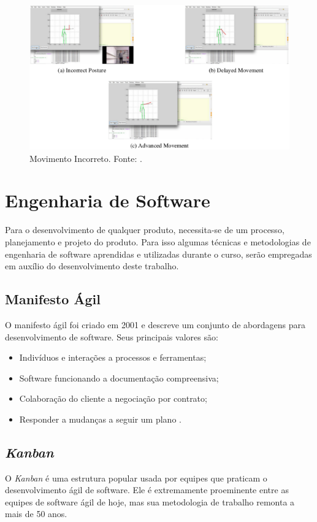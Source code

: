 \begin{figure}[H]
\centering
\includegraphics [keepaspectratio=true,scale=0.60]{figuras/movimentoIncorreto.eps}

\caption{Movimento Incorreto. Fonte: \cite{roberto}.}
\label{movimentoIncorreto}
\end{figure}

\section{Engenharia de Software}\label{sec:engenhariaSoft}
  Para o desenvolvimento de qualquer produto, necessita-se de um processo,
planejamento e projeto do produto. Para isso algumas técnicas e metodologias de
engenharia de software  aprendidas e utilizadas durante o curso, serão empregadas em
auxílio do desenvolvimento deste trabalho.
\subsection{Manifesto Ágil}
\label{sec:Manifesto Ágil}
  O manifesto ágil foi criado em 2001 e descreve um conjunto de abordagens para
desenvolvimento de software.
  Seus principais valores são:
  \begin{itemize}
  \item Indivíduos e interações a processos e ferramentas;
  \item Software funcionando a documentação compreensiva;
  \item Colaboração do cliente a negociação por contrato;
  \item Responder a mudanças a seguir um plano \cite{manifestoAgil}.
  \end{itemize}


\subsection{\textit{Kanban}}
\label{sec:kanban}
O \textit{Kanban} é uma estrutura popular usada por equipes que praticam o desenvolvimento ágil de software. Ele é extremamente proeminente entre as equipes de software ágil de hoje, mas sua metodologia de trabalho remonta a mais de 50 anos.

